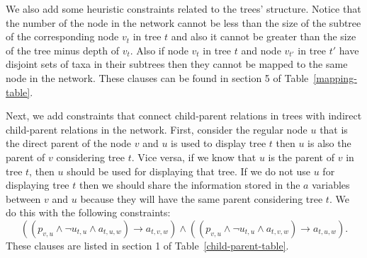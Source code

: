 \documentclass[runningheads, envcountsame, a4paper]{llncs}
\begin{document}
We also add some heuristic constraints related to the trees' structure. Notice that the number of the node in the network 
cannot be less than the  size of the subtree of the corresponding node $v_t$ in tree $t$ and also it cannot be greater than 
the size of the tree minus depth of $v_t$. Also if node $v_t$ in tree $t$ and node $v_{t'}$ in tree $t'$ have disjoint sets of 
taxa in their subtrees then they cannot be mapped to the same node in the network. These clauses can be found in section 5 of 
Table~\ref{mapping-table}.

Next, we add constraints that connect child-parent relations in trees with indirect child-parent relations in 
the network. First, consider the regular node $u$ that is the direct parent of the node $v$ and $u$ is used 
to display tree $t$ then $u$ is also the parent of $v$ considering tree $t$. 
Vice versa, if we know that $u$ is the parent of $v$ in tree $t$, then 
$u$ should be used for displaying that tree. If we do not use $u$ for displaying tree $t$ then we should share the 
information stored in the $a$ variables between $v$ and $u$ because they will have the same parent considering tree $t$. 
We do this with the following constraints:
$$\left(\left(p_{v,u} \wedge \neg u_{t,u} \wedge a_{t,u,w}\right) \rightarrow a_{t,v,w}\right)
\wedge \left( \left(p_{v,u} \wedge \neg u_{t,u} \wedge a_{t,v,w}\right) \rightarrow a_{t,u,w} \right).$$
These clauses are listed in section 1 of Table~\ref{child-parent-table}.
\end{document}
